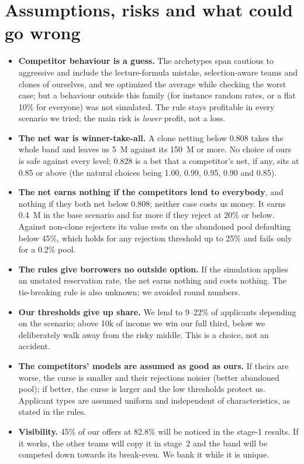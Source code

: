 \documentclass[11pt,a4paper]{article}
\newcommand{\meur}{M\texteuro}
\begin{document}
\section{Assumptions, risks and what could go wrong}
\begin{itemize}
  \item \textbf{Competitor behaviour is a guess.} The archetypes span cautious to aggressive and include the
        lecture-formula mistake, selection-aware teams and clones of ourselves, and we optimized the average while
        checking the worst case; but a behaviour outside this family (for instance random rates, or a flat 10\%
        for everyone) was not simulated. The rule stays profitable in every scenario we tried; the main risk is
        \emph{lower} profit, not a loss.
  \item \textbf{The net war is winner-take-all.} A clone netting below 0.808 takes the whole band and leaves us
        5~\meur{} against its 150~\meur{} or more. No choice of ours is safe against every level; 0.828 is a bet
        that a competitor's net, if any, sits at 0.85 or above (the natural choices being 1.00, 0.99, 0.95, 0.90
        and 0.85).
  \item \textbf{The net earns nothing if the competitors lend to everybody}, and nothing if they both net below
        0.808; neither case costs us money. It earns 0.4~\meur{} in the base scenario and far more if they reject
        at 20\% or below. Against non-clone rejecters its value rests on the abandoned pool defaulting below 45\%,
        which holds for any rejection threshold up to 25\% and fails only for a 0.2\% pool.
  \item \textbf{The rules give borrowers no outside option.} If the simulation applies an unstated reservation
        rate, the net earns nothing and costs nothing. The tie-breaking rule is also unknown; we avoided round
        numbers.
  \item \textbf{Our thresholds give up share.} We lend to 9--22\% of applicants depending on the scenario; above
        10k of income we win our full third, below we deliberately walk away from the risky middle. This is a
        choice, not an accident.
  \item \textbf{The competitors' models are assumed as good as ours.} If theirs are worse, the curse is smaller
        and their rejections noisier (better abandoned pool); if better, the curse is larger and the low thresholds
        protect us. Applicant types are assumed uniform and independent of characteristics, as stated in the rules.
  \item \textbf{Visibility.} 45\% of our offers at 82.8\% will be noticed in the stage-1 results. If it works, the
        other teams will copy it in stage~2 and the band will be competed down towards its break-even. We bank it
        while it is unique.
\end{itemize}
\end{document}
